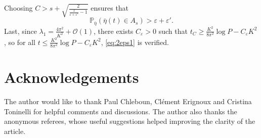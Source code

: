 \documentclass[11pt,a4paper]{article}
\newcommand{\PP}{\mathbb{P}}
\newcommand{\eq}[2]{\begin{equation}\label{#1}#2\end{equation}}
\begin{document}
Choosing $C > s+\sqrt{\frac{2}{\frac{1}{\varepsilon+\varepsilon'}-1}}$ ensures that
\eq{eq:lbprob}{\PP_{\bar{\eta}}(\bar{\eta}(t) \in A_s) > \varepsilon+\varepsilon'.}
Last, since $\lambda_1 = \frac{4\pi^2}{K^2} + \mathcal{O}(1)$, there exists $C_\varepsilon>0$ such that $t_C\ge \frac{K^2}{8\pi^2}\log P - C_\varepsilon K^2$, so for all $t \le\frac{K^2}{8\pi^2}\log P - C_\varepsilon K^2 $, \eqref{eq:2eps1} is verified.


\section*{Acknowledgements} The author would like to thank Paul Chleboun, Clément Erignoux and Cristina Toninelli for helpful comments and discussions. The author also thanks the anonymous referees, whose useful suggestions helped improving the clarity of the article. 



\end{document}
